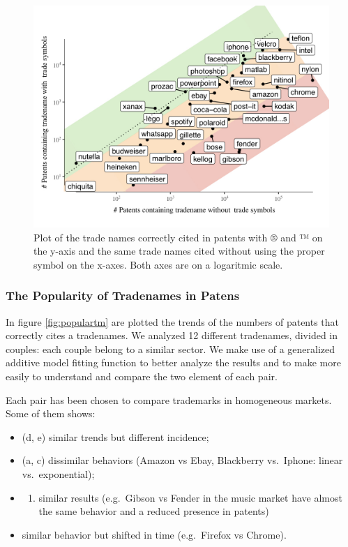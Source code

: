\documentclass[]{book}
\providecommand{\tightlist}{%
  \setlength{\itemsep}{0pt}\setlength{\parskip}{0pt}}
\theoremstyle{definition}
\theoremstyle{definition}
\theoremstyle{definition}
\theoremstyle{remark}
\begin{document}
\begin{figure}

{\centering \includegraphics[width=1\linewidth]{_bookdown_files/figures/TrendsMarks.001} 

}

\caption{Plot of the trade names correctly cited in patents with ® and ™ on the y-axis and the same trade names cited without using the proper symbol on the x-axes. Both axes are on a logaritmic scale.}\label{fig:tmcitedwell}
\end{figure}

\subsubsection*{The Popularity of Tradenames in
Patens}\label{the-popularity-of-tradenames-in-patens}

In figure \ref{fig:populartm} are plotted the trends of the numbers of
patents that correctly cites a tradenames. We analyzed 12 different
tradenames, divided in couples: each couple belong to a similar sector.
We make use of a generalized additive model fitting function to better
analyze the results and to make more easily to understand and compare
the two element of each pair.

Each pair has been chosen to compare trademarks in homogeneous markets.
Some of them shows:

\begin{itemize}
\item
  (d, e) similar trends but different incidence;
\item
  (a, c) dissimilar behaviors (Amazon vs Ebay, Blackberry vs.~Iphone:
  linear vs.~exponential);
\item
  \begin{enumerate}
  \def\labelenumi{(\alph{enumi})}
  \setcounter{enumi}{5}
  \tightlist
  \item
    similar results (e.g.~Gibson vs Fender in the music market have
    almost the same behavior and a reduced presence in patents)
  \end{enumerate}
\item
  similar behavior but shifted in time (e.g.~Firefox vs Chrome).
\end{itemize}
\end{document}

